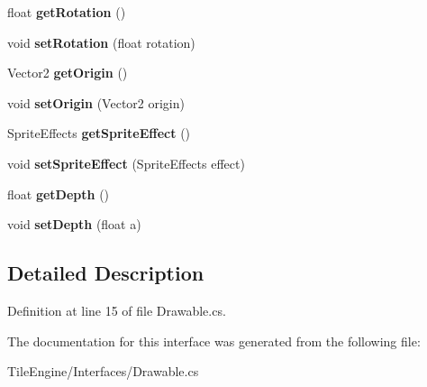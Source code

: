 \begin{DoxyCompactItemize}
\item 
\hypertarget{interface_tile_engine_1_1_interfaces_1_1_drawable_a529a9fdf66059e6fd7b0667b24606677}{float {\bfseries get\-Rotation} ()}\label{interface_tile_engine_1_1_interfaces_1_1_drawable_a529a9fdf66059e6fd7b0667b24606677}

\item 
\hypertarget{interface_tile_engine_1_1_interfaces_1_1_drawable_ae6e1519894803f06962fe18dc8ce9eb1}{void {\bfseries set\-Rotation} (float rotation)}\label{interface_tile_engine_1_1_interfaces_1_1_drawable_ae6e1519894803f06962fe18dc8ce9eb1}

\item 
\hypertarget{interface_tile_engine_1_1_interfaces_1_1_drawable_a7a2b78c94c78d691b33111a145478095}{Vector2 {\bfseries get\-Origin} ()}\label{interface_tile_engine_1_1_interfaces_1_1_drawable_a7a2b78c94c78d691b33111a145478095}

\item 
\hypertarget{interface_tile_engine_1_1_interfaces_1_1_drawable_a21ccc11a9d8bcc95114e1d015bcacc9a}{void {\bfseries set\-Origin} (Vector2 origin)}\label{interface_tile_engine_1_1_interfaces_1_1_drawable_a21ccc11a9d8bcc95114e1d015bcacc9a}

\item 
\hypertarget{interface_tile_engine_1_1_interfaces_1_1_drawable_aee9136fe00cfa3e331af37f2992ea544}{Sprite\-Effects {\bfseries get\-Sprite\-Effect} ()}\label{interface_tile_engine_1_1_interfaces_1_1_drawable_aee9136fe00cfa3e331af37f2992ea544}

\item 
\hypertarget{interface_tile_engine_1_1_interfaces_1_1_drawable_a491bf435b14ebb55027988c79cb661cf}{void {\bfseries set\-Sprite\-Effect} (Sprite\-Effects effect)}\label{interface_tile_engine_1_1_interfaces_1_1_drawable_a491bf435b14ebb55027988c79cb661cf}

\item 
\hypertarget{interface_tile_engine_1_1_interfaces_1_1_drawable_a59e47795fcca97cb79dc15a6945d9275}{float {\bfseries get\-Depth} ()}\label{interface_tile_engine_1_1_interfaces_1_1_drawable_a59e47795fcca97cb79dc15a6945d9275}

\item 
\hypertarget{interface_tile_engine_1_1_interfaces_1_1_drawable_ade7e95cd5f7f1d3afce9f0a63c89a052}{void {\bfseries set\-Depth} (float a)}\label{interface_tile_engine_1_1_interfaces_1_1_drawable_ade7e95cd5f7f1d3afce9f0a63c89a052}

\end{DoxyCompactItemize}


\subsection{Detailed Description}


Definition at line 15 of file Drawable.\-cs.



The documentation for this interface was generated from the following file\-:\begin{DoxyCompactItemize}
\item 
Tile\-Engine/\-Interfaces/Drawable.\-cs\end{DoxyCompactItemize}
